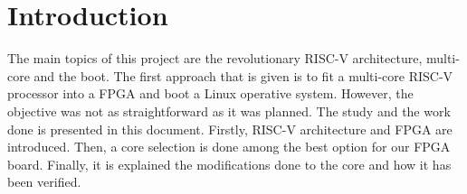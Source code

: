 \section{Introduction}
The main topics of this project are the revolutionary RISC-V architecture, multi-core and the boot. The first approach that is given is to 
fit a multi-core RISC-V processor into a \gls{FPGA} and boot a Linux operative system. However, the objective was not as straightforward as it was planned. The study and the work done is presented in this document. Firstly, RISC-V architecture and \gls{FPGA} are introduced. Then, a core selection is done among the best option for our \gls{FPGA} board. Finally, it is explained the modifications done to the core and how it has been verified. 

